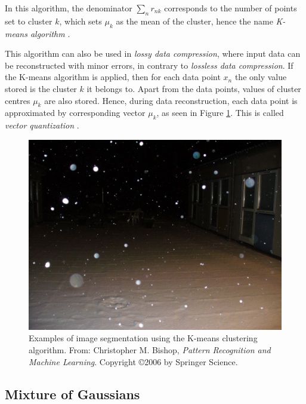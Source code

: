 \noindent In this algorithm, the denominator $\sum\limits_n r_{nk}$ corresponds to the number of points set to cluster $k$, which sets $\mu_k$ as the mean of the cluster, hence the name \textit{K-means algorithm} \cite{BIS06}.
\newline

\noindent This algorithm can also be used in \textit{lossy data compression}, where input data can be reconstructed with minor errors, in contrary to \textit{lossless data compression}. If the K-means algorithm is applied, then for each data point $x_n$ the only value stored is the cluster $k$ it belongs to. Apart from the data points, values of cluster centres $\mu_k$ are also stored. Hence, during data reconstruction, each data point is approximated by corresponding vector $\mu_k$, as seen in Figure \ref{k-mean_lossy}. This is called \textit{vector quantization} \cite{BIS06}.
\newline

\begin{figure}[!h]
\begin{center}
\noindent \includegraphics[scale=0.1]{figures/k-mean_lossy} 
\newline
\caption{Examples of image segmentation using the K-means clustering algorithm. From: Christopher M. Bishop, \textit{Pattern Recognition and Machine Learning}. Copyright \copyright  2006 by Springer Science.}
\label{k-mean_lossy}
\end{center} 
\end{figure}

\subsection{Mixture of Gaussians}

